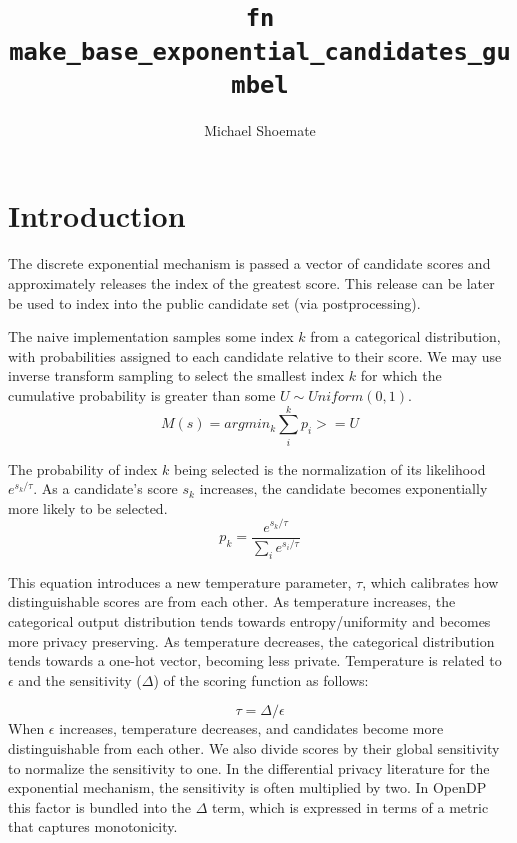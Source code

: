\documentclass{article}
\title{\texttt{fn make\_base\_exponential\_candidates\_gumbel}}
\author{Michael Shoemate}
\begin{document}
\maketitle

\section{Introduction}
The discrete exponential mechanism is passed a vector of candidate scores 
and approximately releases the index of the greatest score.
This release can be later be used to index into the public candidate set (via postprocessing).


The naive implementation samples some index $k$ from a categorical distribution, 
with probabilities assigned to each candidate relative to their score.
We may use inverse transform sampling to select the smallest index $k$ for which the cumulative probability is greater than some $U \sim Uniform(0, 1)$.
\begin{equation}
    \label{m-naive}
    M(s) = argmin_k \sum_i^k p_i >= U
\end{equation}

The probability of index $k$ being selected is the normalization of its likelihood $e^{s_k / \tau}$.
As a candidate's score $s_k$ increases, the candidate becomes exponentially more likely to be selected.
\begin{equation}
    \label{prob-of-k}
    p_k = \frac{e^{s_k / \tau}}{\sum_i e^{s_i / \tau}}
\end{equation}

This equation introduces a new temperature parameter, $\tau$, which calibrates how distinguishable scores are from each other.
As temperature increases, the categorical output distribution tends towards entropy/uniformity and becomes more privacy preserving.
As temperature decreases, the categorical distribution tends towards a one-hot vector, becoming less private.
Temperature is related to $\epsilon$ and the sensitivity ($\Delta$) of the scoring function as follows:

\begin{equation}
    \tau = \Delta / \epsilon
\end{equation}
When $\epsilon$ increases, temperature decreases, and candidates become more distinguishable from each other.
We also divide scores by their global sensitivity to normalize the sensitivity to one.
In the differential privacy literature for the exponential mechanism, the sensitivity is often multiplied by two.
In OpenDP this factor is bundled into the $\Delta$ term, which is expressed in terms of a metric that captures monotonicity.
\end{document}
